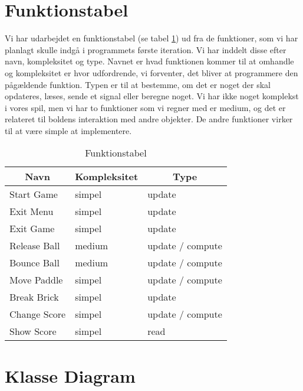 \section{Funktionstabel}
Vi har udarbejdet en funktionstabel (se  tabel \ref{funktionstabel}) ud fra de funktioner, som vi har planlagt skulle indgå i programmets første iteration. Vi har inddelt disse efter navn, kompleksitet og type. Navnet er hvad funktionen kommer til at omhandle og kompleksitet er hvor udfordrende, vi forventer, det bliver at programmere den pågældende funktion. Typen er til at bestemme, om det er noget der skal opdateres, læses, sende et signal eller beregne noget. Vi har ikke noget komplekst i vores spil, men vi har to funktioner som vi regner med er medium, og det er relateret til boldens interaktion med andre objekter. De andre funktioner virker til at være simple at implementere.
\begin{table}[]
\centering
\caption{Funktionstabel}
\label{funktionstabel}
\begin{tabular}{|l|l|l|}
\hline
\multicolumn{1}{|c|}{Navn} & \multicolumn{1}{c|}{Kompleksitet} & \multicolumn{1}{c|}{Type} \\ \hline
Start Game & simpel & update \\ \hline
Exit Menu & simpel & update \\ \hline
Exit Game & simpel & update \\ \hline
Release Ball & medium & update / compute \\ \hline
Bounce Ball & medium & update / compute \\ \hline
Move Paddle & simpel & update / compute \\ \hline
Break Brick & simpel & update \\ \hline
Change Score & simpel & update / compute \\ \hline
Show Score & simpel & read \\ \hline
\end{tabular}
\end{table}

\section{Klasse Diagram}

